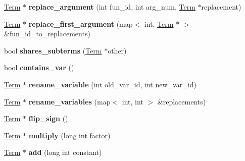 \begin{DoxyCompactItemize}
\item 
\hypertarget{classTerm_a97c1a43cbabf5b8b53d58cae43dcc355}{\hyperlink{classTerm}{\-Term} $\ast$ {\bfseries replace\-\_\-argument} (int fun\-\_\-id, int arg\-\_\-num, \hyperlink{classTerm}{\-Term} $\ast$replacement)}\label{classTerm_a97c1a43cbabf5b8b53d58cae43dcc355}

\item 
\hypertarget{classTerm_ab471816cb9b296a9bb3f21ab44a4768f}{\hyperlink{classTerm}{\-Term} $\ast$ {\bfseries replace\-\_\-first\-\_\-argument} (map$<$ int, \hyperlink{classTerm}{\-Term} $\ast$ $>$ \&fun\-\_\-id\-\_\-to\-\_\-replacements)}\label{classTerm_ab471816cb9b296a9bb3f21ab44a4768f}

\item 
\hypertarget{classTerm_a37733a2ff1a1b24bd9f4fd3000a88a19}{bool {\bfseries shares\-\_\-subterms} (\hyperlink{classTerm}{\-Term} $\ast$other)}\label{classTerm_a37733a2ff1a1b24bd9f4fd3000a88a19}

\item 
\hypertarget{classTerm_a56c02b4c370ddd87d04318452bd60d36}{bool {\bfseries contains\-\_\-var} ()}\label{classTerm_a56c02b4c370ddd87d04318452bd60d36}

\item 
\hypertarget{classTerm_ac63abe07c0ae7b48340d9aea94d83249}{\hyperlink{classTerm}{\-Term} $\ast$ {\bfseries rename\-\_\-variable} (int old\-\_\-var\-\_\-id, int new\-\_\-var\-\_\-id)}\label{classTerm_ac63abe07c0ae7b48340d9aea94d83249}

\item 
\hypertarget{classTerm_abb1d7100eaa04d92c18a484429e124f2}{\hyperlink{classTerm}{\-Term} $\ast$ {\bfseries rename\-\_\-variables} (map$<$ int, int $>$ \&replacements)}\label{classTerm_abb1d7100eaa04d92c18a484429e124f2}

\item 
\hypertarget{classTerm_aba4768b8f008757184e6c4037e33ed43}{\hyperlink{classTerm}{\-Term} $\ast$ {\bfseries flip\-\_\-sign} ()}\label{classTerm_aba4768b8f008757184e6c4037e33ed43}

\item 
\hypertarget{classTerm_a7b6ce6dafbe7523c8d13e0d216058a79}{\hyperlink{classTerm}{\-Term} $\ast$ {\bfseries multiply} (long int factor)}\label{classTerm_a7b6ce6dafbe7523c8d13e0d216058a79}

\item 
\hypertarget{classTerm_a2877a445223a37626aa185578814d596}{\hyperlink{classTerm}{\-Term} $\ast$ {\bfseries add} (long int constant)}\label{classTerm_a2877a445223a37626aa185578814d596}


\end{DoxyCompactItemize}
